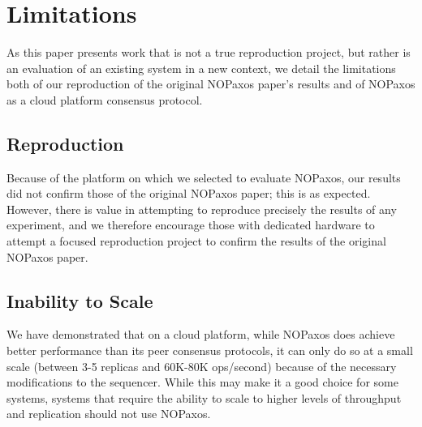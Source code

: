 \section{Limitations}

As this paper presents work that is not a true reproduction project, but rather is an evaluation of an existing system in a new context, we detail the limitations both of our reproduction of the original NOPaxos paper's results and of NOPaxos as a cloud platform consensus protocol.

\subsection{Reproduction}

Because of the platform on which we selected to evaluate NOPaxos, our results did not confirm those of the original NOPaxos paper; this is as expected. However, there is value in attempting to reproduce precisely the results of any experiment, and we therefore encourage those with dedicated hardware to attempt a focused reproduction project to confirm the results of the original NOPaxos paper. 

\subsection{Inability to Scale}

We have demonstrated that on a cloud platform, while NOPaxos does achieve better performance than its peer consensus protocols, it can only do so at a small scale (between 3-5 replicas and 60K-80K ops/second) because of the necessary modifications to the sequencer. While this may make it a good choice for some systems, systems that require the ability to scale to higher levels of throughput and replication should not use NOPaxos. 
